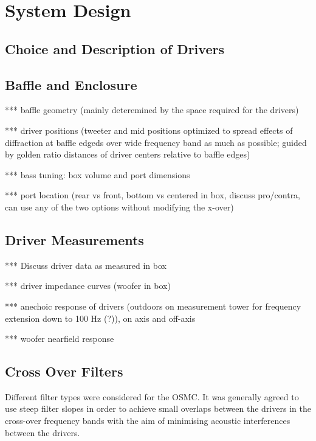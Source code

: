 \documentclass[12pt,a4paper]{article}
\providecommand{\seclabel}[1]{\label{sec:#1}}
\begin{document}
\section{System Design}


\subsection{Choice and Description of Drivers}


\subsection{Baffle and Enclosure}

*** baffle geometry (mainly deteremined by the space required for the drivers)

*** driver positions (tweeter and mid positions optimized to spread effects of diffraction at baffle edgeds over wide frequency band as much as possible; guided by golden ratio distances of driver centers relative to baffle edges)

*** bass tuning: box volume and port dimensions

*** port location (rear vs front, bottom vs centered in box, discuss pro/contra, can use any of the two options without modifying the x-over)


\subsection{Driver Measurements}\seclabel{driver_measurements}

*** Discuss driver data as measured in box

*** driver impedance curves (woofer in box)

*** anechoic response of drivers (outdoors on measurement tower for frequency extension down to 100 Hz (?)), on axis and off-axis

*** woofer nearfield response


\subsection{Cross Over Filters}

Different filter types were considered for the OSMC. It was generally agreed to use steep filter slopes in order to achieve small overlaps between the drivers in the cross-over frequency bands with the aim of minimising acoustic interferences between the drivers.
\end{document}
